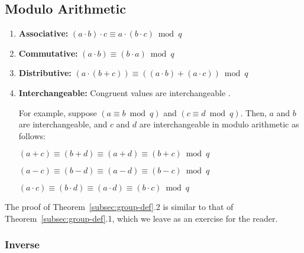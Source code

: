 \subsection{Modulo Arithmetic}
\label{subsec:modulo-arithmetic}


\begin{tcolorbox}[title={\textbf{\tboxtheorem{\ref*{subsec:group-def}.2} Properties of Modulo Arithmetic}}]

\begin{enumerate}
\item \textbf{Associative:} $(a \cdot b) \cdot c \equiv a \cdot (b \cdot c) \bmod q$

\item \textbf{Commutative:} $(a \cdot b) \equiv (b \cdot a) \bmod q$

\item \textbf{Distributive:} $(a \cdot (b + c)) \equiv ((a \cdot b) + (a \cdot c))  \bmod q$

\item \textbf{Interchangeable:} Congruent values are interchangeable . 

For example, suppose $(a \equiv b \bmod q)$ and $(c \equiv d \bmod q)$. Then, $a$ and $b$ are interchangeable, and $c$ and $d$ are interchangeable in modulo arithmetic as follows:

$(a + c) \equiv (b + d) \equiv (a + d) \equiv (b + c) \bmod q$

$(a - c) \equiv (b - d) \equiv (a - d) \equiv (b - c) \bmod q$

$(a \cdot c) \equiv (b \cdot d) \equiv (a \cdot d) \equiv (b \cdot c) \bmod q$

\end{enumerate}

\end{tcolorbox}

The proof of Theorem~\ref*{subsec:group-def}.2 is similar to that of Theorem~\ref*{subsec:group-def}.1, which we leave as an exercise for the reader. 


\subsubsection{Inverse}
\label{subsec:modulo-inverse}

